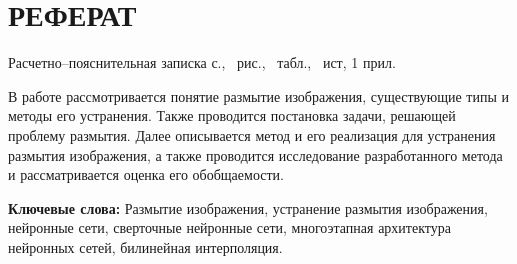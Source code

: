 \part*{РЕФЕРАТ}

Расчетно--пояснительная записка \pageref{LastPage} с., \totalfigures\ рис., \totaltables\ табл., \thetotalbibentries\ ист, 1 прил.

В работе рассмотривается понятие размытие изображения, существующие типы и методы его устранения. Также проводится постановка задачи, решающей проблему размытия. Далее описывается метод и его реализация для устранения размытия изображения, а также проводится исследование разработанного метода и рассматривается оценка его обобщаемости.

\textbf{Ключевые слова:} Размытие изображения, устранение размытия изображения, нейронные сети, сверточные нейронные сети, многоэтапная архитектура нейронных сетей, билинейная интерполяция.